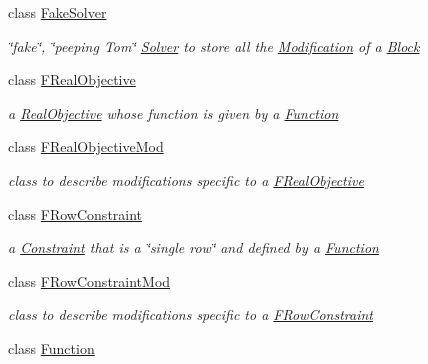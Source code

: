 \begin{DoxyCompactItemize}
class \mbox{\hyperlink{class_s_m_spp__di__unipi__it_1_1_fake_solver}{Fake\+Solver}}
\begin{DoxyCompactList}\small\item\em \char`\"{}fake\char`\"{}, \char`\"{}peeping Tom\char`\"{} \mbox{\hyperlink{class_s_m_spp__di__unipi__it_1_1_solver}{Solver}} to store all the \mbox{\hyperlink{class_s_m_spp__di__unipi__it_1_1_modification}{Modification}} of a \mbox{\hyperlink{class_s_m_spp__di__unipi__it_1_1_block}{Block}} \end{DoxyCompactList}\item 
class \mbox{\hyperlink{class_s_m_spp__di__unipi__it_1_1_f_real_objective}{F\+Real\+Objective}}
\begin{DoxyCompactList}\small\item\em a \mbox{\hyperlink{class_s_m_spp__di__unipi__it_1_1_real_objective}{Real\+Objective}} whose function is given by a \mbox{\hyperlink{class_s_m_spp__di__unipi__it_1_1_function}{Function}} \end{DoxyCompactList}\item 
class \mbox{\hyperlink{class_s_m_spp__di__unipi__it_1_1_f_real_objective_mod}{F\+Real\+Objective\+Mod}}
\begin{DoxyCompactList}\small\item\em class to describe modifications specific to a \mbox{\hyperlink{class_s_m_spp__di__unipi__it_1_1_f_real_objective}{F\+Real\+Objective}} \end{DoxyCompactList}\item 
class \mbox{\hyperlink{class_s_m_spp__di__unipi__it_1_1_f_row_constraint}{F\+Row\+Constraint}}
\begin{DoxyCompactList}\small\item\em a \mbox{\hyperlink{class_s_m_spp__di__unipi__it_1_1_constraint}{Constraint}} that is a \char`\"{}single row\char`\"{} and defined by a \mbox{\hyperlink{class_s_m_spp__di__unipi__it_1_1_function}{Function}} \end{DoxyCompactList}\item 
class \mbox{\hyperlink{class_s_m_spp__di__unipi__it_1_1_f_row_constraint_mod}{F\+Row\+Constraint\+Mod}}
\begin{DoxyCompactList}\small\item\em class to describe modifications specific to a \mbox{\hyperlink{class_s_m_spp__di__unipi__it_1_1_f_row_constraint}{F\+Row\+Constraint}} \end{DoxyCompactList}\item 
class \mbox{\hyperlink{class_s_m_spp__di__unipi__it_1_1_function}{Function}}

\end{DoxyCompactItemize}
